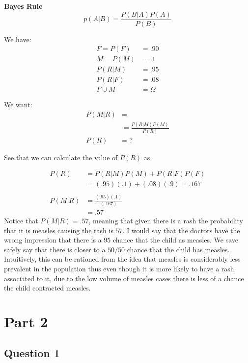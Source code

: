 \documentclass[
]{article}
\begin{document}
\textbf{Bayes Rule}\\
\[
p(A|B)=\frac{P(B|A)P(A)}{P(B)}
\]

We have:\\

\[
\begin{aligned}
  F = P(F) &= .90 \\
  M = P(M) &= .1 \\
  P(R|M) &= .95 \\
  P(R|F) &= .08 \\
  F \cup M &= \Omega
\end{aligned}
\]

We want:\\

\[
\begin{aligned}
  P(M|R) &= \\
         &= \frac{P(R|M)P(M)}{P(R)}\\
    P(R) &=  \text{ ?}
\end{aligned}
\]

See that we can calculate the value of \(P(R)\) as

\[
\begin{aligned}
  P(R) &= P(R|M)P(M) + P(R|F)P(F) \\
       &= (.95)(.1) + (.08)(.9) = .167 \\
       \\
P(M|R) &= \frac{(.95)(.1)}{(.167)} \\
       &= .57       
\end{aligned}
\] Notice that \(P(M|R)=.57\), meaning that given there is a rash the
probability that it is measles causing the rash is \(57%
\). I would say that the doctors have the wrong impression that there is
a \(95%
\) chance that the child as measles. We save safely say that there is
closer to a \(50/50\) chance that the child has measles. Intuitively,
this can be rationed from the idea that measles is considerably less
prevalent in the population thus even though it is more likely to have a
rash associated to it, due to the low volume of measles cases there is
less of a chance the child contracted measles.

\newpage

\section{Part 2}\label{part-2}

\subsection{Question 1}\label{question-1}
\end{document}
